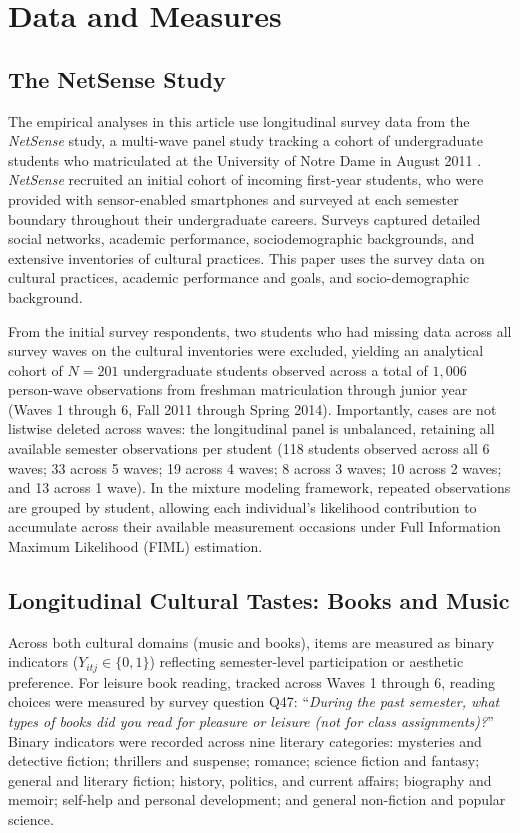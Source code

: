 \documentclass[12pt]{article}
\begin{document}
\section{Data and Measures}\label{sec:data}

\subsection{The NetSense Study}

The empirical analyses in this article use longitudinal survey data from the \textit{NetSense} study, a multi-wave panel study tracking a cohort of undergraduate students who matriculated at the University of Notre Dame in August 2011 \citep{striegel2013lessons}. \textit{NetSense} recruited an initial cohort of incoming first-year students, who were provided with sensor-enabled smartphones and surveyed at each semester boundary throughout their undergraduate careers. Surveys captured detailed social networks, academic performance, sociodemographic backgrounds, and extensive inventories of cultural practices. This paper uses the survey data on cultural practices, academic performance and goals, and socio-demographic background.

From the initial survey respondents, two students who had missing data across all survey waves on the cultural inventories were excluded, yielding an analytical cohort of $N = 201$ undergraduate students observed across a total of $1,006$ person-wave observations from freshman matriculation through junior year (Waves 1 through 6, Fall 2011 through Spring 2014). Importantly, cases are not listwise deleted across waves: the longitudinal panel is unbalanced, retaining all available semester observations per student (118 students observed across all 6 waves; 33 across 5 waves; 19 across 4 waves; 8 across 3 waves; 10 across 2 waves; and 13 across 1 wave). In the mixture modeling framework, repeated observations are grouped by student, allowing each individual's likelihood contribution to accumulate across their available measurement occasions under Full Information Maximum Likelihood (FIML) estimation.

\subsection{Longitudinal Cultural Tastes: Books and Music}

Across both cultural domains (music and books), items are measured as binary indicators ($Y_{itj} \in \{0, 1\}$) reflecting semester-level participation or aesthetic preference. For leisure book reading, tracked across Waves 1 through 6, reading choices were measured by survey question Q47: ``\textit{During the past semester, what types of books did you read for pleasure or leisure (not for class assignments)?}'' Binary indicators were recorded across nine literary categories: mysteries and detective fiction; thrillers and suspense; romance; science fiction and fantasy; general and literary fiction; history, politics, and current affairs; biography and memoir; self-help and personal development; and general non-fiction and popular science.
\end{document}
